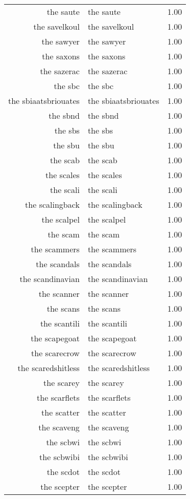 \begin{table}[ht]
\begin{tabular}{rlr}
  the saute & the saute & 1.00 \\ 
  the savelkoul & the savelkoul & 1.00 \\ 
  the sawyer & the sawyer & 1.00 \\ 
  the saxons & the saxons & 1.00 \\ 
  the sazerac & the sazerac & 1.00 \\ 
  the sbc & the sbc & 1.00 \\ 
  the sbiaatsbriouates & the sbiaatsbriouates & 1.00 \\ 
  the sbnd & the sbnd & 1.00 \\ 
  the sbs & the sbs & 1.00 \\ 
  the sbu & the sbu & 1.00 \\ 
  the scab & the scab & 1.00 \\ 
  the scales & the scales & 1.00 \\ 
  the scali & the scali & 1.00 \\ 
  the scalingback & the scalingback & 1.00 \\ 
  the scalpel & the scalpel & 1.00 \\ 
  the scam & the scam & 1.00 \\ 
  the scammers & the scammers & 1.00 \\ 
  the scandals & the scandals & 1.00 \\ 
  the scandinavian & the scandinavian & 1.00 \\ 
  the scanner & the scanner & 1.00 \\ 
  the scans & the scans & 1.00 \\ 
  the scantili & the scantili & 1.00 \\ 
  the scapegoat & the scapegoat & 1.00 \\ 
  the scarecrow & the scarecrow & 1.00 \\ 
  the scaredshitless & the scaredshitless & 1.00 \\ 
  the scarey & the scarey & 1.00 \\ 
  the scarflets & the scarflets & 1.00 \\ 
  the scatter & the scatter & 1.00 \\ 
  the scaveng & the scaveng & 1.00 \\ 
  the scbwi & the scbwi & 1.00 \\ 
  the scbwibi & the scbwibi & 1.00 \\ 
  the scdot & the scdot & 1.00 \\ 
  the scepter & the scepter & 1.00 \\ 

\end{tabular}
\end{table}

